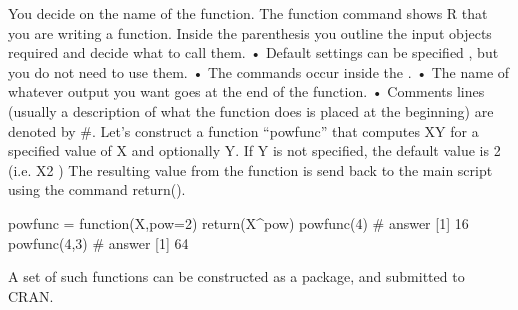 You decide on the name of the function. The function command shows R that you are writing a function. Inside the parenthesis you outline the input objects required and decide what to call them.
•	Default settings can be specified , but you do not need to use them.
•	The commands occur inside the { }.
•	The name of whatever output you want goes at the end of the function. 
•	Comments lines (usually a description of what the function does is placed at the beginning) are denoted by #.
Let’s construct a function “powfunc” that computes XY for a specified value of X and optionally Y. If Y is not specified, the default value is 2 (i.e. X2 )
The resulting value from the function is send back to the main script using the command return().

powfunc = function(X,pow=2){
return(X^pow)
}
powfunc(4)
# answer [1] 16
powfunc(4,3)
# answer [1] 64

A set of such functions can be constructed as a package, and submitted to CRAN.

